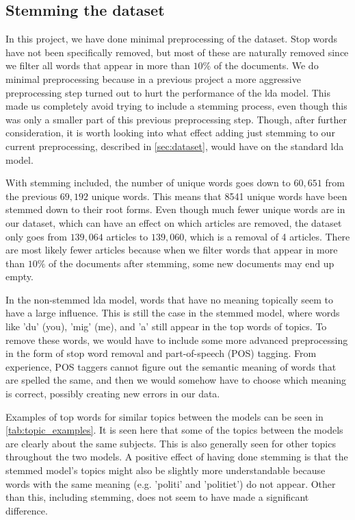 \subsection{Stemming the dataset}\label{sec:stemming}
In this project, we have done minimal preprocessing of the dataset.
Stop words have not been specifically removed, but most of these are naturally removed since we filter all words that appear in more than $10\%$ of the documents.
We do minimal preprocessing because in a previous project a more aggressive preprocessing step turned out to hurt the performance of the \gls{lda} model.
This made us completely avoid trying to include a stemming process, even though this was only a smaller part of this previous preprocessing step.
Though, after further consideration, it is worth looking into what effect adding just stemming to our current preprocessing, described in \autoref{sec:dataset}, would have on the standard \gls{lda} model.

With stemming included, the number of unique words goes down to $60,651$ from the previous $69,192$ unique words.
This means that 8541 unique words have been stemmed down to their root forms.
Even though much fewer unique words are in our dataset, which can have an effect on which articles are removed, the dataset only goes from $139,064$ articles to $139,060$, which is a removal of 4 articles.
There are most likely fewer articles because when we filter words that appear in more than $10\%$ of the documents after stemming, some new documents may end up empty.

In the non-stemmed \gls{lda} model, words that have no meaning topically seem to have a large influence.
This is still the case in the stemmed model, where words like 'du' (you), 'mig' (me), and 'a' still appear in the top words of topics.
To remove these words, we would have to include some more advanced preprocessing in the form of stop word removal and part-of-speech (POS) tagging.
From experience, POS taggers cannot figure out the semantic meaning of words that are spelled the same, and then we would somehow have to choose which meaning is correct, possibly creating new errors in our data.

Examples of top words for similar topics between the models can be seen in \autoref{tab:topic_examples}.
It is seen here that some of the topics between the models are clearly about the same subjects.
This is also generally seen for other topics throughout the two models.
A positive effect of having done stemming is that the stemmed model's topics might also be slightly more understandable because words with the same meaning (e.g. 'politi' and 'politiet') do not appear.
Other than this, including stemming, does not seem to have made a significant difference.

